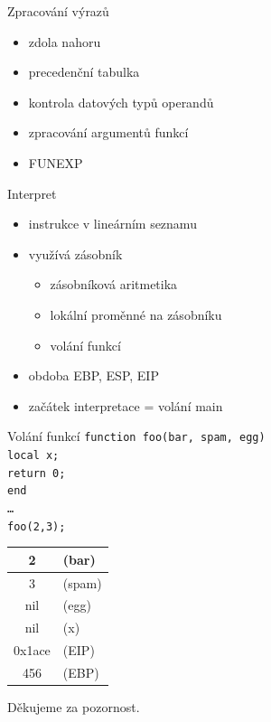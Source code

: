 \documentclass{beamer}
\begin{document}
\begin{frame}{Zpracování výrazů}
  \begin{itemize}
  \item zdola nahoru
  \item precedenční tabulka
  \item kontrola datových typů operandů
  \item zpracování argumentů funkcí
  \item FUNEXP
  \end{itemize}
\end{frame}

\begin{frame}{Interpret}
  \begin{itemize}
  \item instrukce v lineárním seznamu
  \item využívá zásobník
    \begin{itemize}
    \item zásobníková aritmetika
    \item lokální proměnné na zásobníku
    \item volání funkcí
    \end{itemize}
  \item obdoba EBP, ESP, EIP
  \item začátek interpretace = volání main
  \end{itemize}
\end{frame}

\begin{frame}{Volání funkcí}
  \tt{function foo(bar, spam, egg)\\\hspace{2em} local x;\\\hspace{2em} return 0;\\end}\\
  \ldots\\
  \tt{foo(2,3);}\\
  \begin{center}
  \begin{tabular}{|c l|}
    \hline
    2 & (bar)\\\hline
    3 & (spam)\\\hline
    nil & (egg)\\\hline
    nil & (x)\\\hline
    0x1ace & (EIP)\\\hline
    456 & (EBP)\\\hline
  \end{tabular}
  \end{center}
\end{frame}

\begin{frame}{}
  \begin{center}
    Děkujeme za pozornost.
  \end{center}
\end{frame}
\end{document}
